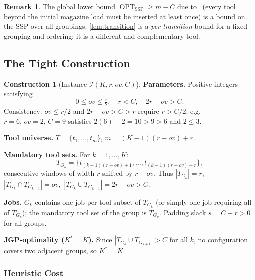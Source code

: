 \documentclass[11pt,a4paper]{article}
\theoremstyle{plain}
\theoremstyle{definition}
\newtheorem{construction}[theorem]{Construction}
\newtheorem{remark}[theorem]{Remark}
\DeclareMathOperator{\OPT}{OPT}
\newcommand{\Kstar}{K^{*}}
\begin{document}
\begin{remark}
\label{rem:literature-lb}
The global lower bound $\OPT_{\mathrm{SSP}}\ge m-C$ due to~\cite{daSilva2021}
(every tool beyond the initial magazine load must be inserted at least once)
is a bound on the SSP over all groupings.
\cref{lem:transition} is a \emph{per-transition} bound for a fixed grouping and
ordering; it is a different and complementary tool.
\end{remark}

\subsection{The Tight Construction}
\label{sec:construction}

\begin{constructbox}
\begin{construction}[Instance $\mathcal{I}(K,r,\mathit{ov},C)$]
\label{const:main}
\textbf{Parameters.} Positive integers satisfying
\begin{equation}
  \label{eq:params}
  0\le \mathit{ov}\le\tfrac{r}{2},
  \quad
  r < C,
  \quad
  2r-\mathit{ov} > C.
\end{equation}
Consistency: $\mathit{ov}\le r/2$ and $2r-\mathit{ov}>C>r$ require $r>C/2$;
e.g.\ $r=6,\,\mathit{ov}=2,\,C=9$ satisfies $2(6)-2=10>9>6$ and $2\le 3$. \medskip

\noindent\textbf{Tool universe.}
$T=\{t_1,\ldots,t_m\}$, $m=(K-1)(r-\mathit{ov})+r$.\medskip

\noindent\textbf{Mandatory tool sets.} For $k=1,\ldots,K$:
\[
  T_{G_k}=\{t_{(k-1)(r-\mathit{ov})+1},\ldots,t_{(k-1)(r-\mathit{ov})+r}\},
\]
consecutive windows of width $r$ shifted by $r-\mathit{ov}$.
Thus $|T_{G_k}|=r$,\ $|T_{G_k}\cap T_{G_{k+1}}|=\mathit{ov}$,\
$|T_{G_k}\cup T_{G_{k+1}}|=2r-\mathit{ov}>C$.\medskip

\noindent\textbf{Jobs.} $G_k$ contains one job per tool subset of $T_{G_k}$
(or simply one job requiring all of $T_{G_k}$); the mandatory tool set of the group
is $T_{G_k}$. Padding slack $s=C-r>0$ for all groups.\medskip

\noindent\textbf{JGP-optimality ($\Kstar=K$).}
Since $|T_{G_k}\cup T_{G_{k+1}}|>C$ for all $k$, no configuration covers two adjacent
groups, so $\Kstar=K$.
\end{construction}
\end{constructbox}

\subsubsection{Heuristic Cost}
\end{document}
